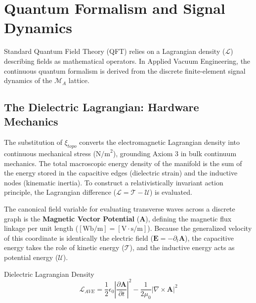 \chapter{Quantum Formalism and Signal Dynamics}
\label{ch:quantum_signal_dynamics}

Standard Quantum Field Theory (QFT) relies on a Lagrangian density ($\mathcal{L}$) describing fields as mathematical operators. In Applied Vacuum Engineering, the continuous quantum formalism is derived from the discrete finite-element signal dynamics of the $\mathcal{M}_A$ lattice.

\section{The Dielectric Lagrangian: Hardware Mechanics}
The substitution of $\xi_{topo}$ converts the electromagnetic Lagrangian density into continuous mechanical stress ($\text{N/m}^2$), grounding Axiom 3 in bulk continuum mechanics. The total macroscopic energy density of the manifold is the sum of the energy stored in the capacitive edges (dielectric strain) and the inductive nodes (kinematic inertia). To construct a relativistically invariant action principle, the Lagrangian difference ($\mathcal{L} = \mathcal{T} - \mathcal{U}$) is evaluated.

The canonical field variable for evaluating transverse waves across a discrete graph is the \textbf{Magnetic Vector Potential} ($\mathbf{A}$), defining the magnetic flux linkage per unit length ($[\text{Wb/m}] = [\text{V}\cdot\text{s/m}]$). Because the generalized velocity of this coordinate is identically the electric field ($\mathbf{E} = -\partial_t \mathbf{A}$), the capacitive energy takes the role of kinetic energy ($\mathcal{T}$), and the inductive energy acts as potential energy ($\mathcal{U}$).
\begin{resultbox}{Dielectric Lagrangian Density}
\begin{equation}
    \mathcal{L}_{AVE} = \frac{1}{2} \epsilon_0 \left| \frac{\partial \mathbf{A}}{\partial t} \right|^2 - \frac{1}{2\mu_0} |\nabla \times \mathbf{A}|^2
\end{equation}
\end{resultbox}


